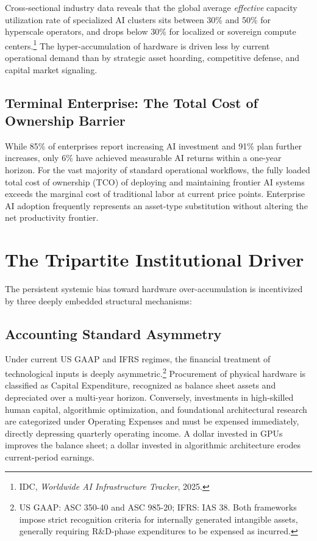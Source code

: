 \documentclass[11pt,letterpaper]{article}
\begin{document}
Cross-sectional industry data reveals that the global average \textit{effective} capacity utilization rate of specialized AI clusters sits between 30\% and 50\% for hyperscale operators, and drops below 30\% for localized or sovereign compute centers.\footnote{IDC, \textit{Worldwide AI Infrastructure Tracker}, 2025.} The hyper-accumulation of hardware is driven less by current operational demand than by strategic asset hoarding, competitive defense, and capital market signaling.

\subsection{Terminal Enterprise: The Total Cost of Ownership Barrier}

While 85\% of enterprises report increasing AI investment and 91\% plan further increases, only 6\% have achieved measurable AI returns within a one-year horizon. For the vast majority of standard operational workflows, the fully loaded total cost of ownership (TCO) of deploying and maintaining frontier AI systems exceeds the marginal cost of traditional labor at current price points. Enterprise AI adoption frequently represents an asset-type substitution without altering the net productivity frontier.

\section{The Tripartite Institutional Driver}

The persistent systemic bias toward hardware over-accumulation is incentivized by three deeply embedded structural mechanisms:

\subsection{Accounting Standard Asymmetry}

Under current US GAAP and IFRS regimes, the financial treatment of technological inputs is deeply asymmetric.\footnote{US GAAP: ASC 350-40 and ASC 985-20; IFRS: IAS 38. Both frameworks impose strict recognition criteria for internally generated intangible assets, generally requiring R\&D-phase expenditures to be expensed as incurred.} Procurement of physical hardware is classified as Capital Expenditure, recognized as balance sheet assets and depreciated over a multi-year horizon. Conversely, investments in high-skilled human capital, algorithmic optimization, and foundational architectural research are categorized under Operating Expenses and must be expensed immediately, directly depressing quarterly operating income. A dollar invested in GPUs improves the balance sheet; a dollar invested in algorithmic architecture erodes current-period earnings.
\end{document}
